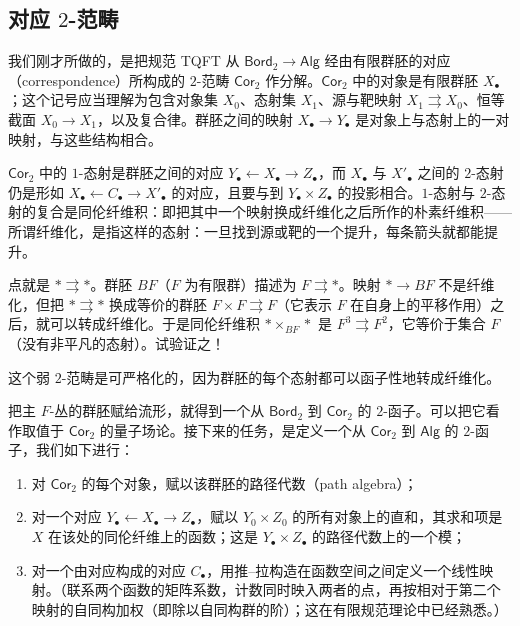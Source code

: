 \subsection{对应 \texorpdfstring{$2$-范畴}{2-范畴}}

我们刚才所做的，是把规范 TQFT 从 $\mathsf{Bord}_2\to\mathsf{Alg}$ 经由有限群胚的对应（correspondence）所构成的 $2$-范畴 $\mathsf{Cor}_2$ 作分解。$\mathsf{Cor}_2$ 中的对象是有限群胚 $X_\bullet$；这个记号应当理解为包含对象集 $X_0$、态射集 $X_1$、源与靶映射 $X_1\rightrightarrows X_0$、恒等截面 $X_0\to X_1$，以及复合律。群胚之间的映射 $X_\bullet\to Y_\bullet$ 是对象上与态射上的一对映射，与这些结构相合。

$\mathsf{Cor}_2$ 中的 $1$-态射是群胚之间的对应 $Y_\bullet\leftarrow X_\bullet\to Z_\bullet$，而 $X_\bullet$ 与 $X'_\bullet$ 之间的 $2$-态射仍是形如 $X_\bullet\leftarrow C_\bullet\to X'_\bullet$ 的对应，且要与到 $Y_\bullet\times Z_\bullet$ 的投影相合。$1$-态射与 $2$-态射的复合是同伦纤维积：即把其中一个映射换成纤维化之后所作的朴素纤维积——所谓纤维化，是指这样的态射：一旦找到源或靶的一个提升，每条箭头就都能提升。

\begin{example}
点就是 $*\rightrightarrows*$。群胚 $BF$（$F$ 为有限群）描述为 $F\rightrightarrows*$。映射 $*\to BF$ 不是纤维化，但把 $*\rightrightarrows*$ 换成等价的群胚 $F\times F\rightrightarrows F$（它表示 $F$ 在自身上的平移作用）之后，就可以转成纤维化。于是同伦纤维积 $*\times_{BF}*$ 是 $F^3\rightrightarrows F^2$，它等价于集合 $F$（没有非平凡的态射）。试验证之！
\end{example}

\begin{remark}
这个弱 $2$-范畴是可严格化的，因为群胚的每个态射都可以函子性地转成纤维化。
\end{remark}

把主 $F$-丛的群胚赋给流形，就得到一个从 $\mathsf{Bord}_2$ 到 $\mathsf{Cor}_2$ 的 $2$-函子。可以把它看作取值于 $\mathsf{Cor}_2$ 的量子场论。接下来的任务，是定义一个从 $\mathsf{Cor}_2$ 到 $\mathsf{Alg}$ 的 $2$-函子，我们如下进行：

\begin{enumerate}[label=(\roman*),leftmargin=3em,itemsep=1pt]
\item 对 $\mathsf{Cor}_2$ 的每个对象，赋以该群胚的路径代数（path algebra）；
\item 对一个对应 $Y_\bullet\leftarrow X_\bullet\to Z_\bullet$，赋以 $Y_0\times Z_0$ 的所有对象上的直和，其求和项是 $X$ 在该处的同伦纤维上的函数；这是 $Y_\bullet\times Z_\bullet$ 的路径代数上的一个模；
\item 对一个由对应构成的对应 $C_\bullet$，用推–拉构造在函数空间之间定义一个线性映射。（联系两个函数的矩阵系数，计数同时映入两者的点，再按相对于第二个映射的自同构加权（即除以自同构群的阶）；这在有限规范理论中已经熟悉。）
\end{enumerate}

